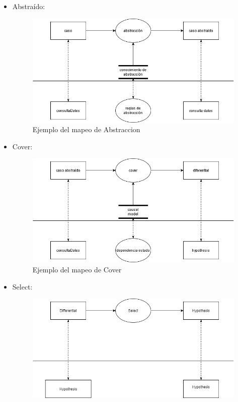 \begin{itemize}
  \item Abstraído:
  \begin{figure}[H]
    \centering
    \includegraphics[scale=0.50]{imagenes/abstraccion_inferencia.png}
    \caption{\label{fig:Cover}Ejemplo del mapeo de Abstraccion}
  \end{figure}
  \item Cover:  
  \begin{figure}[H]
    \centering
    \includegraphics[scale=0.50]{imagenes/cover2.png}
    \caption{\label{fig:Cover}Ejemplo del mapeo de Cover}
  \end{figure}
  \item Select: 
  \begin{figure}[H]
    \centering
    \includegraphics[scale=0.50]{imagenes/select.png}

\end{figure}
\end{itemize}
